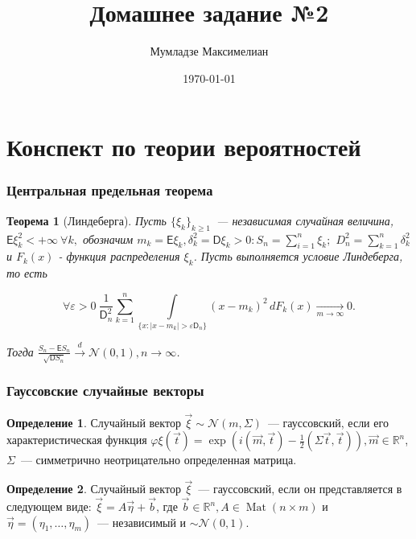 \documentclass[11pt]{article}
\author{Мумладзе Максимелиан}
\title{Домашнее задание №2}
\date{\today}
\DeclareMathOperator{\mat}{Mat}
\newtheorem{thm}{Теорема}[section]
\theoremstyle{definition}\newtheorem{defi}{Определение}
\begin{document}
\maketitle

\part{Конспект по теории вероятностей}

\section{Центральная предельная теорема}

\begin{thm}[Линдеберга]

Пусть $\{\xi_k\}_{k \geq 1}$~--- независимая случайная величина, $\mathsf{E} \xi_k^2 < +\infty ~ \forall k,$ обозначим $m_k = \mathsf{E} \xi_k, \delta_k^2 = \mathsf{D} \xi_k > 0: S_n = \sum\limits_{i = 1}^n \xi_k;$ $D_n^2 = \sum\limits_{k = 1}^n \delta_k^2$ и $F_k(x)$ - функция распределения $\xi_k$. Пусть выполняется условие Линдеберга, то есть

$$
\forall \varepsilon > 0 ~ \frac{1}{\mathsf{D}_n^2} \sum\limits_{k = 1}^n \int\limits_{\{x: |x - m_k| > \varepsilon \mathsf{D}_n\}} (x - m_k)^2\,dF_k(x) \xrightarrow[m \rightarrow \infty]{} 0.
$$

Тогда $\frac{S_n - \mathsf{E} S_n}{\sqrt{\mathsf{D} S_n}} \xrightarrow{d} \mathcal{N}(0, 1), n \rightarrow \infty$.

\end{thm}


\section{Гауссовские случайные векторы}

\begin{defi}

Случайный вектор $\vec \xi \sim \mathcal{N}(m, \Sigma)$~--- гауссовский, если его характеристическая функция $\varphi \xi(\vec t) = \exp(i(\vec m, \vec t) - \frac{1}{2} (\Sigma \vec t, \vec t)), \vec m \in \mathbb{R}^n$, $\Sigma$~--- симметрично неотрицательно определенная матрица.

\end{defi}

\begin{defi}

Случайный вектор $\vec \xi$~--- гауссовский, если он представляется в следующем виде: $\vec \xi = A \vec \eta + \vec b$, где $\vec b \in \mathbb{R}^n, A \in \mat(n \times m)$ и $\vec \eta = (\eta_1, \dots, \eta_m)$~--- независимый и $\sim \mathcal{N}(0, 1)$.

\end{defi}
\end{document}
